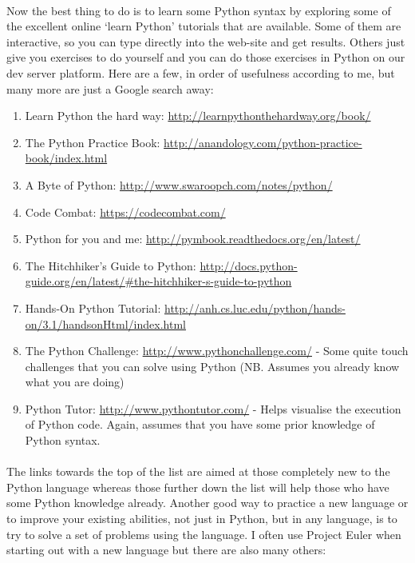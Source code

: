 \documentclass[12pt, a4paper, oneside]{book}
\begin{document}
\paragraph{} Now the best thing to do is to learn some Python syntax by exploring some of the excellent online `learn Python' tutorials that are available. Some of them are interactive, so you can type directly into the web-site and get results. Others just give you exercises to do yourself and you can do those exercises in Python on our dev server platform. Here are a few, in order of usefulness according to me, but many more are just a Google search away:

\begin{enumerate}
\item Learn Python the hard way: \url{http://learnpythonthehardway.org/book/}
\item The Python Practice Book: \url{http://anandology.com/python-practice-book/index.html}
\item A Byte of Python: \url{http://www.swaroopch.com/notes/python/}
\item Code Combat: \url{https://codecombat.com/}
\item Python for you and me: \url{http://pymbook.readthedocs.org/en/latest/}
\item The Hitchhiker's Guide to Python: \url{http://docs.python-guide.org/en/latest/#the-hitchhiker-s-guide-to-python}
\item Hands-On Python Tutorial: \url{http://anh.cs.luc.edu/python/hands-on/3.1/handsonHtml/index.html}
\item The Python Challenge: \url{http://www.pythonchallenge.com/} - Some quite touch challenges that you can solve using Python (NB. Assumes you already know what you are doing)
\item Python Tutor: \url{http://www.pythontutor.com/} - Helps visualise the execution of Python code. Again, assumes that you have some prior knowledge of Python syntax.
\end{enumerate}

\paragraph{} The links towards the top of the list are aimed at those completely new to the Python language whereas those further down the list will help those who have some Python knowledge already. Another good way to practice a new language or to improve your existing abilities, not just in Python, but in any language, is to try to solve a set of problems using the language. I often use Project Euler when starting out with a new language but there are also many others:
\end{document}
